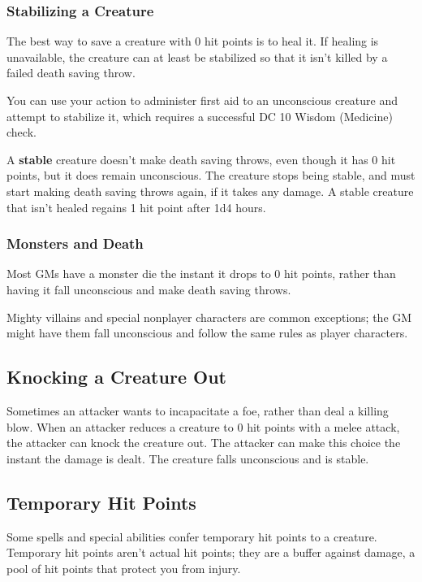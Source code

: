 \subsubsection{Stabilizing a Creature}

The best way to save a creature with 0 hit points is to heal it. If healing is unavailable, the creature can at least be stabilized so that it isn't killed by a failed death saving throw.

You can use your action to administer first aid to an unconscious creature and attempt to stabilize it, which requires a successful DC 10 Wisdom (Medicine) check.

A \textbf{stable} creature doesn't make death saving throws, even though it has 0 hit points, but it does remain unconscious. The creature stops being stable, and must start making death saving throws again, if it takes any damage. A stable creature that isn't healed regains 1 hit point after 1d4 hours.

\subsubsection{Monsters and Death}

Most GMs have a monster die the instant it drops to 0 hit points, rather than having it fall unconscious and make death saving throws.

Mighty villains and special nonplayer characters are common exceptions; the GM might have them fall unconscious and follow the same rules as player characters.

\subsection{Knocking a Creature Out}

Sometimes an attacker wants to incapacitate a foe, rather than deal a killing blow. When an attacker reduces a creature to 0 hit points with a melee attack, the attacker can knock the creature out. The attacker can make this choice the instant the damage is dealt. The creature falls unconscious and is stable.

\subsection{Temporary Hit Points}

Some spells and special abilities confer temporary hit points to a creature. Temporary hit points aren't actual hit points; they are a buffer against damage, a pool of hit points that protect you from injury.

